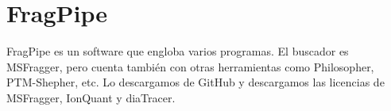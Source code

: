 

\section{FragPipe}
FragPipe es un software que engloba varios programas. El buscador es MSFragger, pero cuenta también con otras herramientas como Philosopher, PTM-Shepher, etc. Lo descargamos de GitHub y descargamos las licencias de MSFragger, IonQuant y diaTracer. 